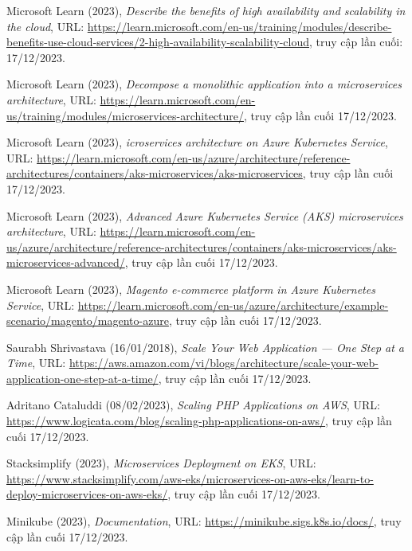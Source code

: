 \begin{thebibliography}{1}
Microsoft Learn (2023), \emph{Describe the benefits of high availability and scalability in the cloud}, URL: \url{https://learn.microsoft.com/en-us/training/modules/describe-benefits-use-cloud-services/2-high-availability-scalability-cloud}, truy cập lần cuối: 17/12/2023.

Microsoft Learn (2023), \emph{Decompose a monolithic application into a microservices architecture}, URL: \url{https://learn.microsoft.com/en-us/training/modules/microservices-architecture/}, truy cập lần cuối 17/12/2023.

Microsoft Learn (2023), \emph{icroservices architecture on Azure Kubernetes Service}, URL: \url{https://learn.microsoft.com/en-us/azure/architecture/reference-architectures/containers/aks-microservices/aks-microservices}, truy cập lần cuối 17/12/2023.

Microsoft Learn (2023), \emph{Advanced Azure Kubernetes Service (AKS) microservices architecture}, URL: \url{https://learn.microsoft.com/en-us/azure/architecture/reference-architectures/containers/aks-microservices/aks-microservices-advanced/}, truy cập lần cuối 17/12/2023.

Microsoft Learn (2023), \emph{Magento e-commerce platform in Azure Kubernetes Service}, URL: \url{https://learn.microsoft.com/en-us/azure/architecture/example-scenario/magento/magento-azure}, truy cập lần cuối 17/12/2023.

Saurabh Shrivastava (16/01/2018), \emph{Scale Your Web Application — One Step at a Time}, URL: \url{https://aws.amazon.com/vi/blogs/architecture/scale-your-web-application-one-step-at-a-time/}, truy cập lần cuối 17/12/2023.

Adritano Cataluddi (08/02/2023), \emph{Scaling PHP Applications on AWS}, URL: \url{https://www.logicata.com/blog/scaling-php-applications-on-aws/}, truy cập lần cuối 17/12/2023.

Stacksimplify (2023), \emph{Microservices Deployment on EKS}, URL: \url{https://www.stacksimplify.com/aws-eks/microservices-on-aws-eks/learn-to-deploy-microservices-on-aws-eks/}, truy cập lần cuối 17/12/2023.

Minikube (2023), \emph{Documentation}, URL: \url{https://minikube.sigs.k8s.io/docs/}, truy cập lần cuối 17/12/2023.


\end{thebibliography}